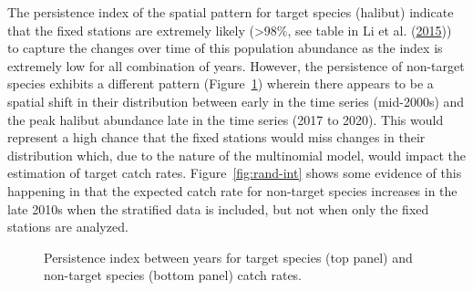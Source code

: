 \documentclass[12pt]{article}\usepackage[]{graphicx}\usepackage[]{color}
\begin{document}
The persistence index of the spatial pattern for target species (halibut) indicate that the fixed stations are extremely likely (\textgreater98\%, see table in Li et al. (\protect\hyperlink{ref-Li2015}{2015})) to capture the changes over time of this population abundance as the index is extremely low for all combination of years. However, the persistence of non-target species exhibits a different pattern (Figure~\ref{fig:persist}) wherein there appears to be a spatial shift in their distribution between early in the time series (mid-2000s) and the peak halibut abundance late in the time series (2017 to 2020). This would represent a high chance that the fixed stations would miss changes in their distribution which, due to the nature of the multinomial model, would impact the estimation of target catch rates. Figure~\ref{fig:rand-int} shows some evidence of this happening in that the expected catch rate for non-target species increases in the late 2010s when the stratified data is included, but not when only the fixed stations are analyzed.
\begin{figure}[htb]

{\centering {}  

}

\caption{Persistence index between years for target species (top panel) and non-target species (bottom panel) catch rates.}\label{fig:persist}
\end{figure}
\end{document}
